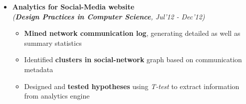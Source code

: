 \begin{itemize}
	\item \textbf{Analytics for Social-Media website} \\
	\emph{(\textbf{Design Practices in Computer Science}, Jul'12 - Dec'12)} \\[-0.7cm]

		\begin{itemize}\itemsep \isep
		\item \textbf{Mined network communication log}, generating detailed as well as summary statistics
		\item Identified \textbf{clusters in social-network} graph based on communication metadata
		\item Designed and \textbf{tested hypotheses} using \textit{T-test} to extract information from analytics engine
		\end{itemize}

\end{itemize}
